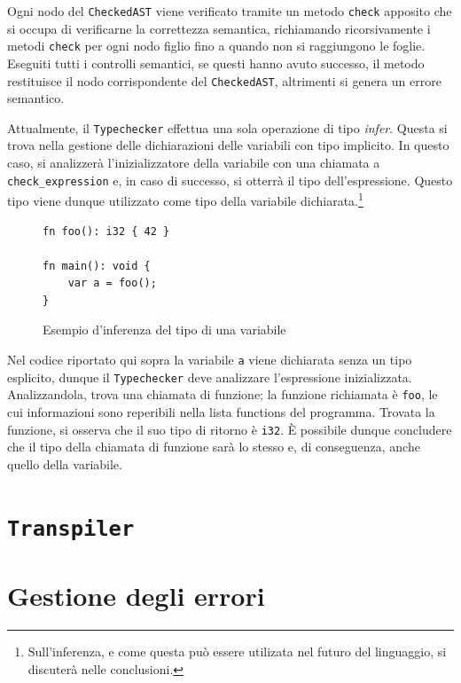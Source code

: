 Ogni nodo del \texttt{CheckedAST} viene verificato tramite un metodo \texttt{check} apposito che si occupa di verificarne la correttezza semantica, richiamando ricorsivamente i metodi \texttt{check} per ogni nodo figlio fino a quando non si raggiungono le foglie. Eseguiti tutti i controlli semantici, se questi hanno avuto successo, il metodo restituisce il nodo corrispondente del \texttt{CheckedAST}, altrimenti si genera un errore semantico.

Attualmente, il \texttt{Typechecker} effettua una sola operazione di tipo \textit{infer}. Questa si trova nella gestione delle dichiarazioni delle variabili con tipo implicito. In questo caso, si analizzer\`a l'inizializzatore della variabile con una chiamata a \texttt{check\_expression} e, in caso di successo, si otterr\`a il tipo dell'espressione. Questo tipo viene dunque utilizzato come tipo della variabile dichiarata.\footnote{Sull'inferenza, e come questa pu\`o essere utilizata nel futuro del linguaggio, si discuter\`a nelle conclusioni.}

\begin{figure}[H]
	\centering
	\begin{verbatim}
fn foo(): i32 { 42 }

fn main(): void {
    var a = foo();
}
  \end{verbatim}
	\caption{Esempio d'inferenza del tipo di una variabile}
	\label{fig:typechecker-var-decl-infer}
\end{figure}

Nel codice riportato qui sopra la variabile \texttt{a} viene dichiarata senza un tipo esplicito, dunque il \texttt{Typechecker} deve analizzare l'espressione inizializzata. Analizzandola, trova una chiamata di funzione; la funzione richiamata è \texttt{foo}, le cui informazioni sono reperibili nella lista functions del programma. Trovata la funzione, si osserva che il suo tipo di ritorno è \texttt{i32}. È possibile dunque concludere che il tipo della chiamata di funzione sarà lo stesso e, di conseguenza, anche quello della variabile.

\section{\texttt{Transpiler}}
\label{sec:transpiler}

\section{Gestione degli errori}
\label{sec:gestione-degli-errori}
